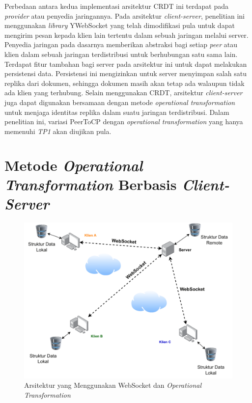 Perbedaan antara kedua implementasi arsitektur CRDT ini terdapat pada \textit{provider} atau penyedia jaringannya. Pada arsitektur \textit{client-server}, penelitian ini menggunakan \textit{library} YWebSocket yang telah dimodifikasi pula untuk dapat mengirim pesan kepada klien lain tertentu dalam sebuah jaringan melalui server. Penyedia jaringan pada dasarnya memberikan abstraksi bagi setiap \textit{peer} atau klien dalam sebuah jaringan terdistribusi untuk berhubungan satu sama lain. Terdapat fitur tambahan bagi server pada arsitektur ini untuk dapat melakukan persistensi data. Persistensi ini mengizinkan untuk server menyimpan salah satu replika dari dokumen, sehingga dokumen masih akan tetap ada walaupun tidak ada klien yang terhubung. Selain menggunakan CRDT, arsitektur \textit{client-server} juga dapat digunakan bersamaan dengan metode \textit{operational transformation} untuk menjaga identitas replika dalam suatu jaringan terdistribusi. Dalam penelitian ini, variasi PeerToCP dengan \textit{operational transformation} yang hanya memenuhi \textit{TP1} akan diujikan pula.

\section{Metode \textit{Operational Transformation} Berbasis \textit{Client-Server}}

\begin{figure}
    \centering
    \includegraphics[scale=0.42]{assets/skripsi/Arsitektur_WebSocket_OT}
    \caption{Arsitektur yang Menggunakan WebSocket dan \textit{Operational Transformation}}
    \label{fig:websocket_ot}
\end{figure}

